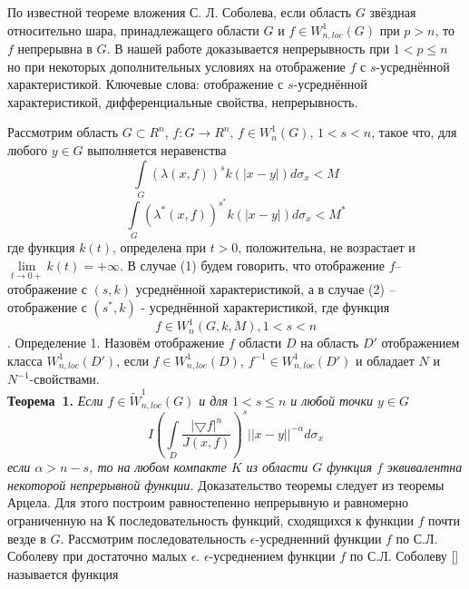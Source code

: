 \vzmscaption
По известной теореме вложения С. Л. Соболева, если область $G$ звёздная относительно шара, принадлежащего области $G$ и $f \in W^{1}_{n,loc}(G)$ при $p>n$, то $f$ непрерывна в $G$. В нашей работе доказывается непрерывность при $1<p\leq n$ но при некоторых дополнительных условиях на отображение $f$ с $s$-усреднённой характеристикой.
Ключевые слова: отображение с $s$-усреднённой характеристикой, дифференциальные свойства, непрерывность.

Рассмотрим область $G\subset R^n$, $f:G\to R^n$, $f\in W^{1}_{n}(G)$, $1<s<n$, такое что, для любого $y\in G$ выполняется неравенства
\begin{equation}
\int\limits_{G}(\lambda(x,f))^{s}k(|x-y|)d\sigma_{x}<M
\end{equation}
\begin{equation}
\int\limits_{G}(\lambda^{*}(x,f))^{s^{*}}k(|x-y|)d\sigma_{x}<M^{*}
\end{equation}
где функция $k(t)$, определена при $t>0$, положительна, не возрастает и $\lim\limits_{t\to 0+}k(t)=+\infty$. В случае (1) будем говорить, что отображение $f$– отображение с $(s,k)$ усреднённой характеристикой, а в случае (2) – отображение с $(s^{*},k)$ - усреднённой характеристикой, где функция $$f\in W^{1}_{n}(G,k,M), 1<s<n$$.
Определение 1. Назовём отображение $f$ области $D$ на область $D'$ отображением класса $W^{1}_{n,loc}(D')$, если $f \in W^{1}_{n,loc}(D)$, $f^{-1} \in W^{1}_{n,loc}(D')$ и обладает $N$ и $N^{-1}$-свойствами.\\
\textbf{Теорема~1.} {\it Если $f\in\widetilde{W}_{n,loc}^1(G) $ и для $1<s\leq n$ и любой точки $y\in G$
\begin{equation}
I\left(
\int\limits_D\frac{|\bigtriangledown f|^{n}}{J(x,f)}
\right)^{s}||x-y||^{-\alpha}d\sigma_{x}
\end{equation}
если $\alpha>n-s$, то на любом компакте $K$ из области $G$ функция $f$ эквивалентна некоторой непрерывной функции.} Доказательство теоремы следует из теоремы Арцела. Для этого построим равностепенно непрерывную и равномерно ограниченную на $К$ последовательность функций, сходящихся к функции $f$ почти везде в $G$. Рассмотрим последовательность $\epsilon$-усредненний функции $f$ по С.Л. Соболеву при достаточно малых $\epsilon$. $\epsilon$-усреднением функции $f$ по С.Л. Соболеву [] называется функция
